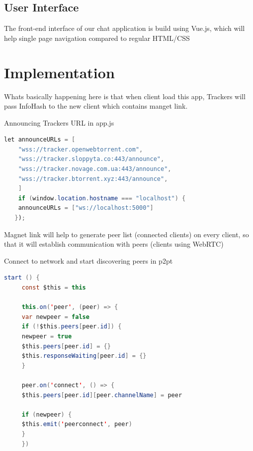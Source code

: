 \documentclass{fisatproject}
\begin{document}
   \vspace{1cm}
  
 
    
    \vspace{1cm}
    \subsection{User Interface}
    The front-end interface of our chat application is build using Vue.js, which will help single page navigation compared to regular HTML/CSS
    \newpage

\section{Implementation}
    Whats basically happening here is that when client load this app, Trackers will pass InfoHash to the new client which contains manget link.
    
        \vspace{0.6cm}
Announcing Trackers URL in app.js  
	\begin{lstlisting}[language=java]
	let announceURLs = [
	"wss://tracker.openwebtorrent.com",
	"wss://tracker.sloppyta.co:443/announce",
	"wss://tracker.novage.com.ua:443/announce",
	"wss://tracker.btorrent.xyz:443/announce",
	]
	if (window.location.hostname === "localhost") {
	announceURLs = ["ws://localhost:5000"]
   });
   \end{lstlisting}
           \vspace{0.6cm}
   Magnet link will help to generate peer list (connected clients) on every client, so that it will establish communication with peers (clients using WebRTC)
   
   
              \vspace{0.6cm}
              Connect to network and start discovering peers in p2pt
	 \begin{lstlisting}[language=java]
	 start () {
	 const $this = this
	 
	 this.on('peer', (peer) => {
	 var newpeer = false
	 if (!$this.peers[peer.id]) {
	 newpeer = true
	 $this.peers[peer.id] = {}
	 $this.responseWaiting[peer.id] = {}
	 }
	 
	 peer.on('connect', () => {
	 $this.peers[peer.id][peer.channelName] = peer
	 
	 if (newpeer) {
	 $this.emit('peerconnect', peer)
	 }
	 })
	    \end{lstlisting}
        \vspace{0.6cm}
\end{document}
